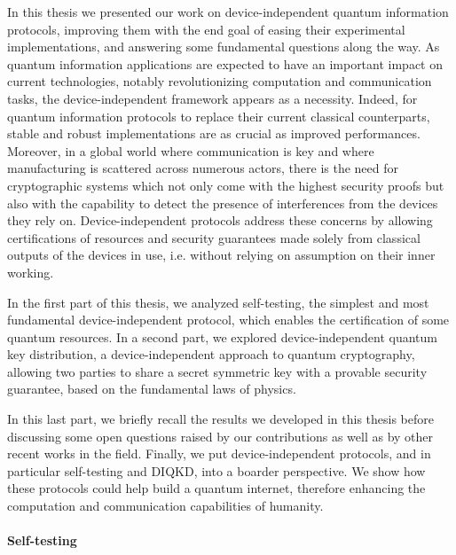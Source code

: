 In this thesis we presented our work on device-independent quantum information protocols, improving them with the end goal of easing their experimental implementations, and answering some fundamental questions along the way.
As quantum information applications are expected to have an important impact on current technologies, notably revolutionizing computation and communication tasks, the device-independent framework appears as a necessity.
Indeed, for quantum information protocols to replace their current classical counterparts, stable and robust implementations are as crucial as improved performances. 
Moreover, in a global world where communication is key and where manufacturing is scattered across numerous actors, there is the need for cryptographic systems which not only come with the highest security proofs but also with the capability to detect the presence of interferences from the devices they rely on.
Device-independent protocols address these concerns by allowing certifications of resources and security guarantees made solely from classical outputs of the devices in use, i.e. without relying on assumption on their inner working. 

In the first part of this thesis, we analyzed self-testing, the simplest and most fundamental device-independent protocol, which enables the certification of some quantum resources.
In a second part, we explored device-independent quantum key distribution, a device-independent approach to quantum cryptography, allowing two parties to share a secret symmetric key with a provable security guarantee, based on the fundamental laws of physics. 

In this last part, we briefly recall the results we developed in this thesis before discussing some open questions raised by our contributions as well as by other recent works in the field.
Finally, we put device-independent protocols, and in particular self-testing and DIQKD, into a boarder perspective.
We show how these protocols could help build a quantum internet, therefore enhancing the computation and communication capabilities of humanity.

\paragraph{Self-testing} 


